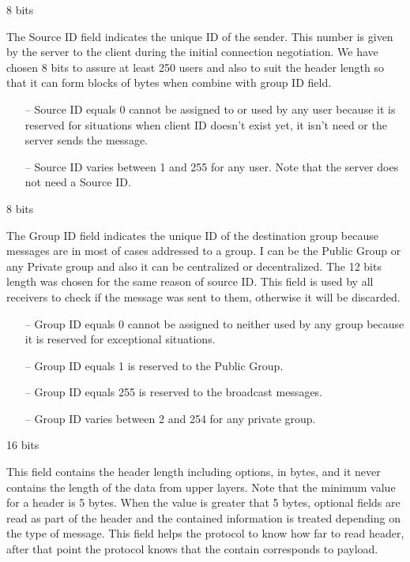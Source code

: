 \documentclass{article}
\begin{document}
\begin{description}[align=left]
    \item [Source ID:] 8 bits
    \begin{flushleft}
        The Source ID field indicates the unique ID of the sender. This number is given by the server to the client during the initial connection negotiation. We have chosen 8 bits to assure at least 250 users and also to suit the header length so that it can form blocks of bytes when combine with group ID field.
        \begin{itemize}
            \item[--] Source ID equals 0 cannot be assigned to or used by any user because it is reserved for situations when client ID doesn't exist yet, it isn't need or the server sends the message.
            \item[--] Source ID varies between 1 and 255 for any user. Note that the server does not need a Source ID.
        \end{itemize}
        
    \end{flushleft}
    
    \item [Group ID:] 8 bits
    \begin{flushleft}
        The Group ID field indicates the unique ID of the destination group because messages are in most of cases addressed to a group. I can be the Public Group or any Private group and also it can be centralized or decentralized. The 12 bits length was chosen for the same reason of source ID. This field is used by all receivers to check if the message was sent to them, otherwise it will be discarded.
        \begin{itemize}
            \item[--] Group ID equals 0 cannot be assigned to neither used by any group because it is reserved for exceptional situations.
            \item[--] Group ID equals 1 is reserved to the Public Group. 
            \item[--] Group ID equals 255 is reserved to the broadcast messages. 
            \item[--] Group ID varies between 2 and 254 for any private group.
        \end{itemize} 
    \end{flushleft}
    
    \item [Header Length:] 16 bits
    \begin{flushleft}
        This field contains the header length including options, in bytes, and it never contains the length of the data from upper layers. Note that the minimum value for a header is 5 bytes. When the value is greater that 5 bytes, optional fields are read as part of the header and the contained information is treated depending on the type of message. This field helps the protocol to know how far to read header, after that point the protocol knows that the contain corresponds to payload.
    \end{flushleft}
    

\end{description}
\end{document}
